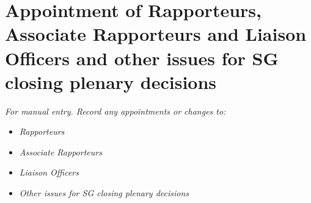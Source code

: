 
\section{Appointment of Rapporteurs, Associate Rapporteurs and Liaison Officers and other issues for SG\studyGroup{} closing plenary decisions}\label{appointment-of-rapporteurs}

\textit{For manual entry. Record any appointments or changes to:}
\begin{itemize}
    \item \textit{Rapporteurs}
    \item \textit{Associate Rapporteurs}
    \item \textit{Liaison Officers}
    \item \textit{Other issues for SG closing plenary decisions}
\end{itemize}
